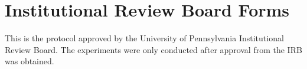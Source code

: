 \documentclass[12pt, letterpaper]{report}
\begin{document}
\section*{Institutional Review Board Forms}
This is the protocol approved by the University of Pennsylvania Institutional Review Board. The experiments were only conducted after approval from the IRB was obtained.\\





\end{document}
